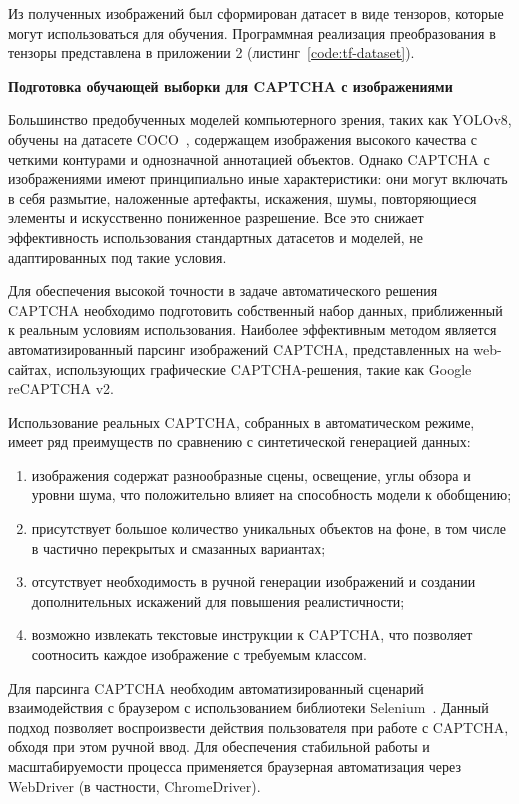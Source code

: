 \vspace{-0.7cm}

Из полученных изображений был сформирован датасет в виде тензоров, которые могут 
использоваться для обучения. Программная реализация преобразования в тензоры 
представлена в приложении 2 (листинг~\ref{code:tf-dataset}).

\textbf{Подготовка обучающей выборки для CAPTCHA с изображениями}

Большинство предобученных моделей компьютерного зрения, таких как YOLOv8, обучены 
на датасете COCO~\cite{COCO}, содержащем изображения высокого качества с четкими 
контурами и однозначной аннотацией объектов. Однако CAPTCHA с изображениями имеют 
принципиально иные характеристики: они могут включать в себя размытие, наложенные 
артефакты, искажения, шумы, повторяющиеся элементы и искусственно пониженное 
разрешение. Все это снижает эффективность использования стандартных датасетов и 
моделей, не адаптированных под такие условия.

Для обеспечения высокой точности в задаче автоматического решения CAPTCHA 
необходимо подготовить собственный набор данных, приближенный к реальным условиям 
использования. Наиболее эффективным методом является автоматизированный парсинг 
изображений CAPTCHA, представленных на web-сайтах, использующих графические 
CAPTCHA-решения, такие как Google reCAPTCHA v2.

Использование реальных CAPTCHA, собранных в автоматическом режиме, имеет ряд 
преимуществ по сравнению с синтетической генерацией данных:

\begin{enumerate}
    \item изображения содержат разнообразные сцены, освещение, углы обзора и 
    уровни шума, что положительно влияет на способность модели к обобщению;
    \item присутствует большое количество уникальных объектов на фоне, в том 
    числе в частично перекрытых и смазанных вариантах;
    \item отсутствует необходимость в ручной генерации изображений и создании 
    дополнительных искажений для повышения реалистичности;
    \item возможно извлекать текстовые инструкции к CAPTCHA, что позволяет 
    соотносить каждое изображение с требуемым классом.
\end{enumerate}

Для парсинга CAPTCHA необходим автоматизированный сценарий взаимодействия с 
браузером с использованием библиотеки Selenium~\cite{Selenium}. Данный подход 
позволяет воспроизвести действия пользователя при работе с CAPTCHA, обходя при 
этом ручной ввод. Для обеспечения стабильной работы и масштабируемости процесса 
применяется браузерная автоматизация через WebDriver (в частности, ChromeDriver).

